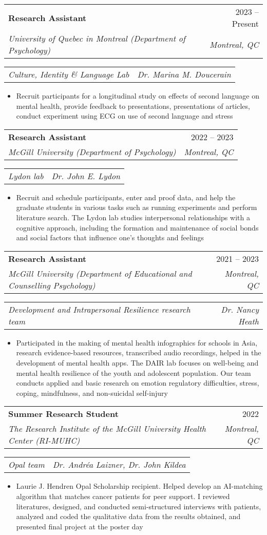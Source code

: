 \documentclass[letterpaper,11pt]{article}
\makeatletter
\newcommand{\resumeItem}[1]{
  \item\small{
    {#1 \vspace{-2pt}}
  }
}
\newcommand{\resumeSubheading}[4]{
  \vspace{-2pt}\item
    \begin{tabular*}{0.97\textwidth}[t]{l@{\extracolsep{\fill}}r}
      \textbf{#1} & #2 \\
      \textit{\small#3} & \textit{\small #4} \\
    \end{tabular*}\vspace{-7pt}
}
\newcommand{\resumeSubSubheading}[2]{
    \item
    \begin{tabular*}{0.97\textwidth}{l@{\extracolsep{\fill}}r}
      \textit{\small#1} & \textit{\small #2} \\
    \end{tabular*}\vspace{-7pt}
}
\newcommand{\resumeItemListStart}{\begin{itemize}}
\newcommand{\resumeItemListEnd}{\end{itemize}\vspace{-5pt}}
\makeatother
\begin{document}
    \resumeSubheading
      {Research Assistant}{2023 -- Present}
      {University of Quebec in Montreal (Department of Psychology)}{Montreal, QC}
   \resumeSubSubheading
    {Culture, Identity \& Language Lab}{Dr. Marina M. Doucerain}
    \resumeItemListStart
       \resumeItem{Recruit participants for a longitudinal study on effects of second language on mental health, provide feedback to presentations, presentations of articles, conduct experiment using ECG on use of second language and stress}
    \resumeItemListEnd

    \resumeSubheading
      {Research Assistant}{2022 -- 2023}
      {McGill University (Department of Psychology)}{Montreal, QC}
   \resumeSubSubheading
    {Lydon lab}{Dr. John E. Lydon}
    \resumeItemListStart
       \resumeItem{Recruit and schedule participants, enter and proof data, and help the graduate students in various tasks such as running experiments and perform literature search. The Lydon lab studies interpersonal relationships with a cognitive approach, including the formation and maintenance of social bonds and social factors that influence one’s thoughts and feelings}
    \resumeItemListEnd

    \resumeSubheading
      {Research Assistant}{2021 -- 2023}
      {McGill University (Department of Educational and Counselling Psychology)}{Montreal, QC}
   \resumeSubSubheading
    {Development and Intrapersonal Resilience research team}{Dr. Nancy Heath}
    \resumeItemListStart
       \resumeItem{Participated in the making of mental health infographics for schools in Asia, research evidence-based resources, transcribed audio recordings, helped in the development of mental health apps. The DAIR lab focuses on well-being and mental health resilience of the youth and adolescent population. Our team conducts applied and basic research on emotion regulatory difficulties, stress, coping, mindfulness, and non-suicidal self-injury}
    \resumeItemListEnd

    \resumeSubheading
      {Summer Research Student}{2022}
      {The Research Institute of the McGill University Health Center (RI-MUHC)}{Montreal, QC}
   \resumeSubSubheading
    {Opal team}{Dr. Andréa Laizner, Dr. John Kildea}
    \resumeItemListStart
       \resumeItem{Laurie J. Hendren Opal Scholarship recipient. Helped develop an AI-matching algorithm that matches cancer patients for peer support. I reviewed literatures, designed, and conducted semi-structured interviews with patients, analyzed and coded the qualitative data from the results obtained, and presented final project at the poster day}
    \resumeItemListEnd
\end{document}
